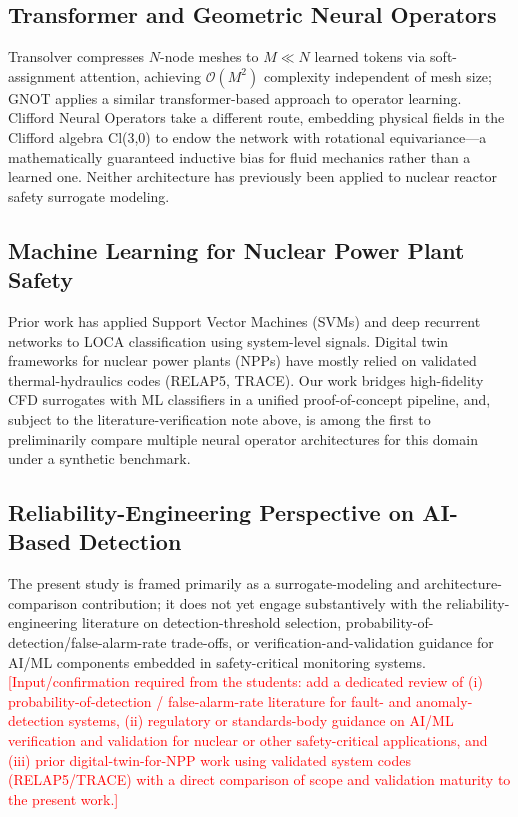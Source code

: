 \documentclass[journal]{IEEEtran}
\begin{document}
\subsection{Transformer and Geometric Neural Operators}
Transolver \cite{wu2024transolver} compresses $N$-node meshes to $M \ll N$ learned tokens via soft-assignment attention, achieving $\mathcal{O}(M^2)$ complexity independent of mesh size; GNOT \cite{hao2023gnot} applies a similar transformer-based approach to operator learning. Clifford Neural Operators \cite{brandstetter2023clifford} take a different route, embedding physical fields in the Clifford algebra Cl(3,0) to endow the network with rotational equivariance---a mathematically guaranteed inductive bias for fluid mechanics rather than a learned one. Neither architecture has previously been applied to nuclear reactor safety surrogate modeling.

\subsection{Machine Learning for Nuclear Power Plant Safety}
Prior work has applied Support Vector Machines (SVMs) \cite{song2018} and deep recurrent networks \cite{choi2019} to LOCA classification using system-level signals. Digital twin frameworks for nuclear power plants (NPPs) \cite{grieves2014, liu2022npp} have mostly relied on validated thermal-hydraulics codes (RELAP5, TRACE). Our work bridges high-fidelity CFD surrogates with ML classifiers in a unified proof-of-concept pipeline, and, subject to the literature-verification note above, is among the first to preliminarily compare multiple neural operator architectures for this domain under a synthetic benchmark.

\subsection{Reliability-Engineering Perspective on AI-Based Detection}
\label{sec:related_reliability}
The present study is framed primarily as a surrogate-modeling and architecture-comparison contribution; it does not yet engage substantively with the reliability-engineering literature on detection-threshold selection, probability-of-detection/false-alarm-rate trade-offs, or verification-and-validation guidance for AI/ML components embedded in safety-critical monitoring systems. \textcolor{red}{[Input/confirmation required from the students: add a dedicated review of (i) probability-of-detection / false-alarm-rate literature for fault- and anomaly-detection systems, (ii) regulatory or standards-body guidance on AI/ML verification and validation for nuclear or other safety-critical applications, and (iii) prior digital-twin-for-NPP work using validated system codes (RELAP5/TRACE) with a direct comparison of scope and validation maturity to the present work.]}
\end{document}
